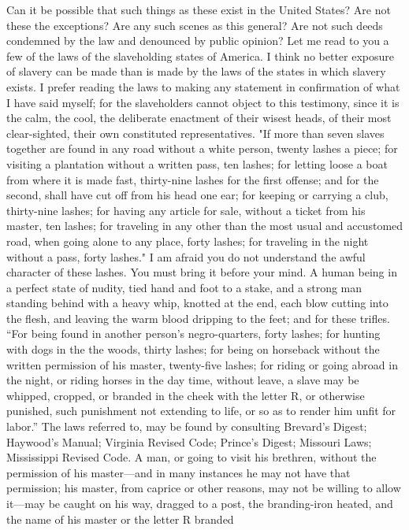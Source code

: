 Can it be possible that such things as these exist in the United States?
Are not these the exceptions? Are any such scenes as this general? Are
not such deeds condemned by the law and denounced by public opinion? Let
me read to you a few of the laws of the slaveholding states of America.
I think no better exposure of slavery can be made than is made by the
laws of the states in which slavery exists. I prefer reading the laws to
making any statement in confirmation of what I have said myself; for the
slaveholders cannot object to this testimony, since it is the calm, the
cool, the deliberate enactment of their wisest heads, of their most
clear-sighted, their own constituted representatives. "If more than
seven slaves together are found in any road without a white person,
twenty lashes a piece; for visiting a plantation without a written pass,
ten lashes; for letting loose a boat from where it is made {}fast,
thirty-nine lashes for the first offense; and for the second, shall have
cut off from his head one ear; for keeping or carrying a club,
thirty-nine lashes; for having any article for sale, without a ticket
from his master, ten lashes; for traveling in any other than the most
usual and accustomed road, when going alone to any place, forty lashes;
for traveling in the night without a pass, forty lashes." I am afraid
you do not understand the awful character of these lashes. You must
bring it before your mind. A human being in a perfect state of nudity,
tied hand and foot to a stake, and a strong man standing behind with a
heavy whip, knotted at the end, each blow cutting into the flesh, and
leaving the warm blood dripping to the feet; and for these trifles.
``For being found in another person's negro-quarters, forty lashes; for
hunting with dogs in the the woods, thirty lashes; for being on
horseback without the written permission of his master, twenty-five
lashes; for riding or going abroad in the night, or riding horses in the
day time, without leave, a slave may be whipped, cropped, or branded in
the cheek with the letter R, or otherwise punished, such punishment not
extending to life, or so as to render him unfit for labor.'' The laws
referred to, may be found by consulting Brevard's Digest; Haywood's
Manual; Virginia Revised Code; Prince's Digest; Missouri Laws;
Mississippi Revised Code. A man, or going to visit his brethren, without
the permission of his master---and in many instances he may not have
that permission; his master, from caprice or other reasons, may not be
willing to allow it---may be caught on his way, dragged to a post, the
branding-iron heated, and the name of his master or the letter R branded
